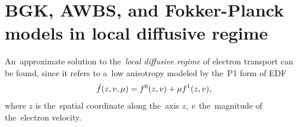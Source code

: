 \section{BGK, AWBS, and Fokker-Planck models in local diffusive regime}
\label{sec:DiffusiveKinetics}


An~approximate solution to the~\textit{local diffusive regime} 
of electron transport can be found, since it
refers to a~low anisotropy modeled by the~P1 form of EDF  
\begin{equation}
  \tilde{f}(z, v, \mu) = f^0(z, v) + \mu f^1(z, v),
  \label{eq:f_approximation}
\end{equation}
where $z$ is the~spatial coordinate along the~axis $z$, $v$ 
the~magnitude of the~electron velocity. 


